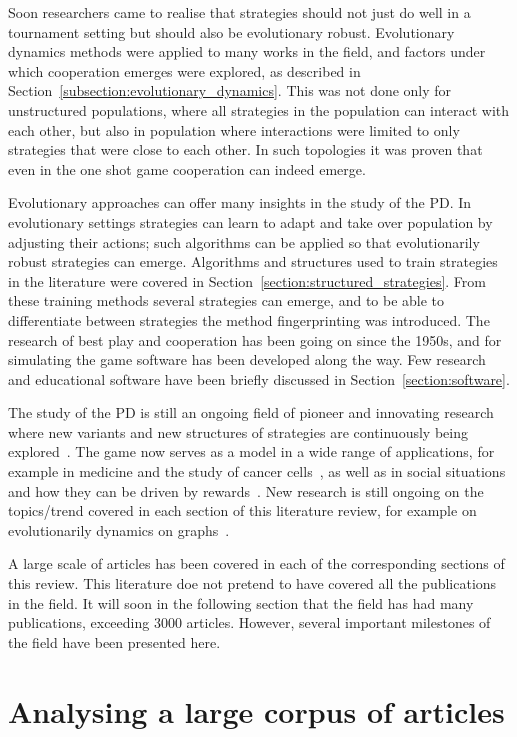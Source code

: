 \documentclass{article}
\theoremstyle{definition}
\begin{document}
Soon researchers came to realise that strategies should not just do well in a tournament setting
but should also be evolutionary robust. Evolutionary dynamics methods were
applied to many works in the field, and factors under which cooperation
emerges were explored, as described in Section~\ref{subsection:evolutionary_dynamics}.
This was not done only for unstructured populations, where all strategies
in the population can interact with each other, but also in population where
interactions were limited to only strategies that were close to each other.
In such topologies it was proven that even in the one shot game cooperation can
indeed emerge.

Evolutionary approaches can offer many insights in the study of the PD. In
evolutionary settings strategies can learn to adapt and take over population by
adjusting their actions; such algorithms can be applied so that evolutionarily
robust strategies can emerge. Algorithms and structures used to train strategies
in the literature were covered in Section~\ref{section:structured_strategies}.
From these training methods several strategies can emerge,
and to be able to differentiate between strategies the method fingerprinting was
introduced. The research of best play and cooperation has been going on since
the 1950s, and for simulating the game software has been developed along the
way. Few research and educational software have been briefly discussed
in Section~\ref{section:software}.

The study of the PD is still an ongoing field of pioneer and
innovating research where new variants and new structures of strategies are
continuously being explored~\cite{Ohtsuki2018}. The game now serves as a model
in a wide range of applications, for example in medicine and the study of cancer
cells~\cite{archetti2018, Kaznatchee2017}, as well as in social situations and
how they can be driven by rewards~\cite{Dridi2018}. New research is still ongoing
on the topics/trend covered in each section of this literature review,
for example on evolutionarily dynamics on graphs~\cite{Allen2017, hathcock2018,
Liu2017}.

A large scale of articles has been covered in each of the corresponding sections
of this review. This literature doe not pretend to have covered all the publications
in the field. It will soon in the following section that the field has had many
publications, exceeding 3000 articles. However, several important milestones
of the field have been presented here.

\section{Analysing a large corpus of articles}\label{section:analysis}
\end{document}
